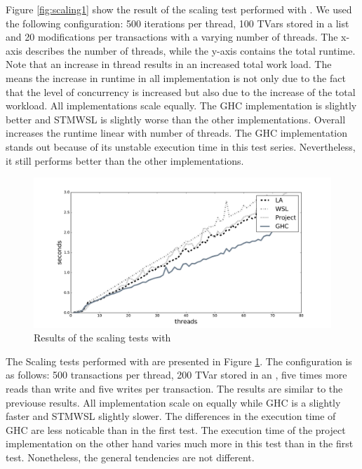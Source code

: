 Figure \ref{fig:scaling1} show the result of the scaling test performed with . We used the following 
configuration: 500 iterations per thread, 100 TVars stored in a list and 20 modifications per transactions with 
a varying number of threads. The x-axis describes the number of threads, while the y-axis contains the total runtime.
Note that an increase in thread results in an increased total work load. The means the increase in runtime in all implementation
is not only due to the fact that the level of concurrency is increased but also due to the increase of the total workload.
All implementations scale equally. The GHC implementation is slightly better and STMWSL is slightly worse than the other 
implementations. Overall increases the runtime linear with number of threads. The GHC implementation stands out because of
its unstable execution time in this test series. Nevertheless, it still performs better than the other implementations.

\begin{figure}
 \centering
 \includegraphics[scale=0.4]{Figures/Scaling2}
\caption[Runtime: Scaling Test II]{Results of the scaling tests with }
\label{fig:scaling2}
\end{figure}

The Scaling tests performed with  are presented in Figure \ref{fig:scaling2}. The configuration 
is as follows: 500 transactions per thread, 200 TVar stored in an , five times more reads than write and
five writes per transaction. The results are similar to the previouse results. All implementation scale on equally while
GHC is a slightly faster and STMWSL slightly slower. The differences in the execution time of GHC are less noticable than 
in the first test. The execution time of the project implementation on the other hand varies much more in this test than
in the first test. Nonetheless, the general tendencies are not different. 

